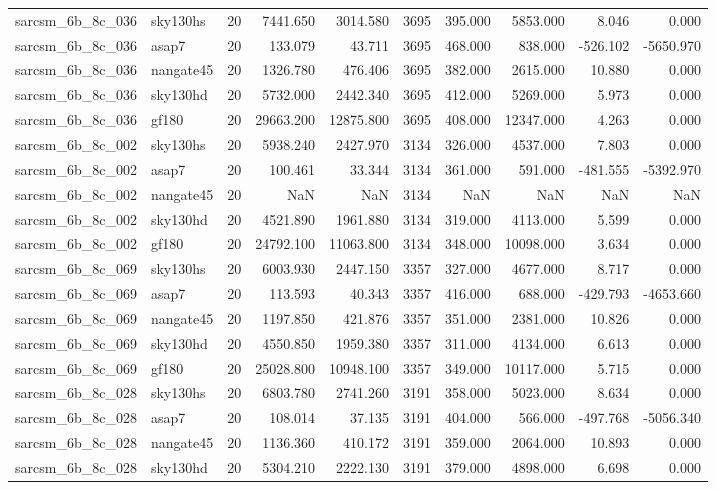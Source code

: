 \begin{tabular}{llrrrrrrrr}
sarcsm\_6b\_8c\_036 & sky130hs & 20 & 7441.650 & 3014.580 & 3695 & 395.000 & 5853.000 & 8.046 & 0.000 \\
sarcsm\_6b\_8c\_036 & asap7 & 20 & 133.079 & 43.711 & 3695 & 468.000 & 838.000 & -526.102 & -5650.970 \\
sarcsm\_6b\_8c\_036 & nangate45 & 20 & 1326.780 & 476.406 & 3695 & 382.000 & 2615.000 & 10.880 & 0.000 \\
sarcsm\_6b\_8c\_036 & sky130hd & 20 & 5732.000 & 2442.340 & 3695 & 412.000 & 5269.000 & 5.973 & 0.000 \\
sarcsm\_6b\_8c\_036 & gf180 & 20 & 29663.200 & 12875.800 & 3695 & 408.000 & 12347.000 & 4.263 & 0.000 \\
sarcsm\_6b\_8c\_002 & sky130hs & 20 & 5938.240 & 2427.970 & 3134 & 326.000 & 4537.000 & 7.803 & 0.000 \\
sarcsm\_6b\_8c\_002 & asap7 & 20 & 100.461 & 33.344 & 3134 & 361.000 & 591.000 & -481.555 & -5392.970 \\
sarcsm\_6b\_8c\_002 & nangate45 & 20 & NaN & NaN & 3134 & NaN & NaN & NaN & NaN \\
sarcsm\_6b\_8c\_002 & sky130hd & 20 & 4521.890 & 1961.880 & 3134 & 319.000 & 4113.000 & 5.599 & 0.000 \\
sarcsm\_6b\_8c\_002 & gf180 & 20 & 24792.100 & 11063.800 & 3134 & 348.000 & 10098.000 & 3.634 & 0.000 \\
sarcsm\_6b\_8c\_069 & sky130hs & 20 & 6003.930 & 2447.150 & 3357 & 327.000 & 4677.000 & 8.717 & 0.000 \\
sarcsm\_6b\_8c\_069 & asap7 & 20 & 113.593 & 40.343 & 3357 & 416.000 & 688.000 & -429.793 & -4653.660 \\
sarcsm\_6b\_8c\_069 & nangate45 & 20 & 1197.850 & 421.876 & 3357 & 351.000 & 2381.000 & 10.826 & 0.000 \\
sarcsm\_6b\_8c\_069 & sky130hd & 20 & 4550.850 & 1959.380 & 3357 & 311.000 & 4134.000 & 6.613 & 0.000 \\
sarcsm\_6b\_8c\_069 & gf180 & 20 & 25028.800 & 10948.100 & 3357 & 349.000 & 10117.000 & 5.715 & 0.000 \\
sarcsm\_6b\_8c\_028 & sky130hs & 20 & 6803.780 & 2741.260 & 3191 & 358.000 & 5023.000 & 8.634 & 0.000 \\
sarcsm\_6b\_8c\_028 & asap7 & 20 & 108.014 & 37.135 & 3191 & 404.000 & 566.000 & -497.768 & -5056.340 \\
sarcsm\_6b\_8c\_028 & nangate45 & 20 & 1136.360 & 410.172 & 3191 & 359.000 & 2064.000 & 10.893 & 0.000 \\
sarcsm\_6b\_8c\_028 & sky130hd & 20 & 5304.210 & 2222.130 & 3191 & 379.000 & 4898.000 & 6.698 & 0.000 \\

\end{tabular}
